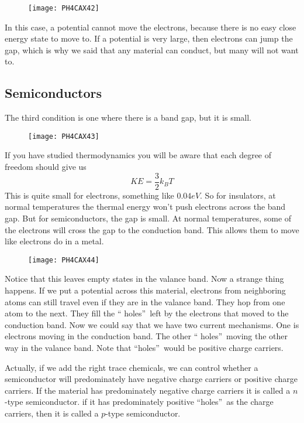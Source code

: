 \begin{figure}[h!]
\texttt{[image: PH4CAX42]}
\end{figure}In this case, a potential cannot
move the electrons, because there is no easy close energy state to move to.
If a potential is very large, then electrons can jump the gap, which is why
we said that any material can conduct, but many will not want to.

\subsection{Semiconductors}

The third condition is one where there is a band gap, but it is small. 
\begin{figure}[h!]
\texttt{[image: PH4CAX43]}
\end{figure}If you have studied
thermodynamics you will be aware that each degree of freedom should give us 
\begin{equation*}
KE=\frac{3}{2}k_{B}T
\end{equation*}%
This is quite small for electrons, something like $0.04\unit{eV}.$ So for
insulators, at normal temperatures the thermal energy won't push electrons
across the band gap. But for semiconductors, the gap is small. At normal
temperatures, some of the electrons will cross the gap to the conduction
band. This allows them to move like electrons do in a metal. \begin{figure}[h!]
\texttt{[image: PH4CAX44]}
\end{figure}

Notice that this leaves empty states in the valance band. Now a strange
thing happens. If we put a potential across this material, electrons from
neighboring atoms can still travel even if they are in the valance band.
They hop from one atom to the next. They fill the \textquotedblleft
holes\textquotedblright\ left by the electrons that moved to the conduction
band. Now we could say that we have two current mechanisms. One is electrons
moving in the conduction band. The other \textquotedblleft
holes\textquotedblright\ moving the other way in the valance band. Note that
\textquotedblleft holes\textquotedblright\ would be positive charge carriers.

Actually, if we add the right trace chemicals, we can control whether a
semiconductor will predominately have negative charge carriers or positive
charge carriers. If the material has predominately negative charge carriers
it is called a $n$-type semiconductor. if it has predominately positive
\textquotedblleft holes\textquotedblright\ as the charge carriers, then it
is called a $p$-type semiconductor.

